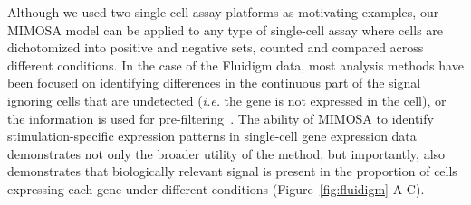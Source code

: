 \documentclass[useAMS,referee,usenatbib]{biom}
\begin{document}

Although we used two single-cell assay platforms as motivating examples, our MIMOSA model can be applied to any type of single-cell assay where cells are dichotomized into positive and negative sets, counted and compared across different conditions. 
In the case of the Fluidigm data, most analysis methods have been focused on identifying differences in the continuous part of the signal ignoring cells that are undetected (\textit{i.e.} the gene is not expressed in the cell), or the information is used for pre-filtering~\citep{Flatz:2011jb}. 
The ability of MIMOSA to identify stimulation-specific expression patterns in single-cell gene expression data demonstrates not only the broader utility of the method, but importantly, also demonstrates that biologically relevant signal is present in the proportion of cells expressing each gene under different conditions (Figure~\ref{fig:fluidigm} A-C). 
\end{document}
